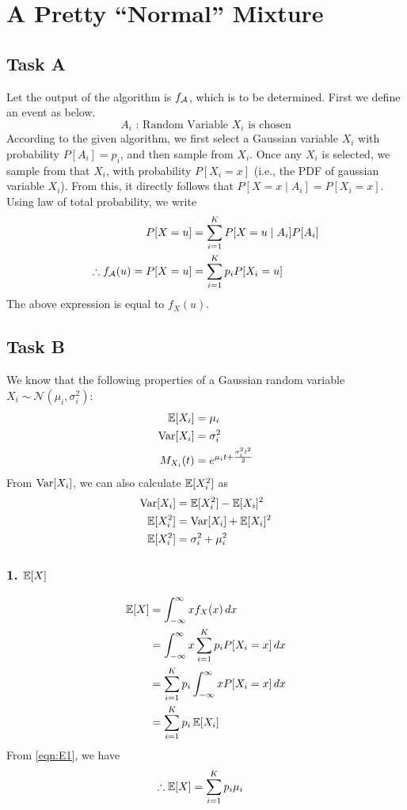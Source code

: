 \section{A Pretty ``Normal'' Mixture}
\subsection*{Task A}
Let the output of the algorithm is $f_{\cal{A}}$, which is to be determined.
First we define an event as below.
\[A_i\text{ : Random Variable }X_i\text{ is chosen}\]
According to the given algorithm, we first select a Gaussian variable $X_i$ with probability $P[A_i]=p_i$, and then sample from $X_i$.
Once any $X_i$ is selected, we sample from that $X_i$, with probability $P[X_i = x]$ (i.e., the PDF of gaussian variable $X_i$). From this, it directly follows that $P[X=x\mid A_i] = P[X_i = x]$.
Using law of total probability, we write
\begin{align*}
	P[X=u]                             & = \sum_{i=1}^K P[X=u\mid A_i]P[A_i] \\
	\therefore f_{\cal{A}}(u) = P[X=u] & = \sum_{i=1}^K p_i P[X_i=u]
\end{align*}
The above expression is equal to $f_X(u)$.

\subsection*{Task B}
We know that the following properties of a Gaussian random variable $X_i \sim \mathcal{N}(\mu_i, \sigma_i^2)$:
\begin{align}
	\operatorname{\mathbb{E}}[X_i]   & = \mu_i \label{eqn:E1}                                  \\
	\operatorname{Var}[X_i]  & = \sigma_i^2 \label{eqn:V1}                             \\
	M_{X_i}(t) & = e^{\mu_i t + \frac{\sigma_i^2 t^2}{2}} \label{eqn:M1}
\end{align}
From $\operatorname{Var}[X_i]$, we can also calculate $\operatorname{\mathbb{E}}[X_i^2]$ as
\begin{align}
	\operatorname{Var}[X_i]  & = \operatorname{\mathbb{E}}[X_i^2] - \operatorname{\mathbb{E}}[X_i]^2 \nonumber \\
	\operatorname{\mathbb{E}}[X_i^2] & = \operatorname{Var}[X_i] + \operatorname{\mathbb{E}}[X_i]^2 \nonumber  \\
	\operatorname{\mathbb{E}}[X_i^2] & = \sigma_i^2 + \mu_i^2
\end{align}
\subsubsection*{1. $\operatorname{\mathbb{E}}[X]$}
\begin{align*}
	\operatorname{\mathbb{E}}[X] & = \int_{-\infty}^{\infty} x f_X(x) \, dx                    \\
	       & = \int_{-\infty}^{\infty} x \sum_{i=1}^K p_i P[X_i=x] \, dx \\
	       & = \sum_{i=1}^K p_i \int_{-\infty}^{\infty} x P[X_i=x] \, dx \\
	       & = \sum_{i=1}^K p_i \operatorname{\mathbb{E}}[X_i]
\end{align*}
From \cref{eqn:E1}, we have
\begin{align}
	\therefore \operatorname{\mathbb{E}}[X] & = \sum_{i=1}^K p_i \mu_i \label{eqn:E2}
\end{align}

